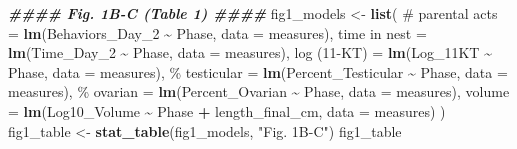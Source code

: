 \documentclass[
  landscape]{article}
\newenvironment{Shaded}{\begin{snugshade}}{\end{snugshade}}
\newcommand{\AttributeTok}[1]{\textcolor[rgb]{0.13,0.29,0.53}{#1}}
\newcommand{\DocumentationTok}[1]{\textcolor[rgb]{0.56,0.35,0.01}{\textbf{\textit{#1}}}}
\newcommand{\FunctionTok}[1]{\textcolor[rgb]{0.13,0.29,0.53}{\textbf{#1}}}
\newcommand{\NormalTok}[1]{#1}
\newcommand{\OtherTok}[1]{\textcolor[rgb]{0.56,0.35,0.01}{#1}}
\newcommand{\SpecialCharTok}[1]{\textcolor[rgb]{0.81,0.36,0.00}{\textbf{#1}}}
\newcommand{\StringTok}[1]{\textcolor[rgb]{0.31,0.60,0.02}{#1}}
\begin{document}
\begin{Shaded}
\begin{Highlighting}[]
\DocumentationTok{\#\#\#\# Fig. 1B{-}C (Table 1) \#\#\#\#}
\NormalTok{fig1\_models }\OtherTok{\textless{}{-}} \FunctionTok{list}\NormalTok{(}
  \StringTok{\textasciigrave{}}\AttributeTok{\# parental acts}\StringTok{\textasciigrave{}} \OtherTok{=} \FunctionTok{lm}\NormalTok{(Behaviors\_Day\_2 }\SpecialCharTok{\textasciitilde{}}\NormalTok{ Phase, }\AttributeTok{data =}\NormalTok{ measures),}
  \StringTok{\textasciigrave{}}\AttributeTok{time in nest}\StringTok{\textasciigrave{}}    \OtherTok{=} \FunctionTok{lm}\NormalTok{(Time\_Day\_2 }\SpecialCharTok{\textasciitilde{}}\NormalTok{ Phase, }\AttributeTok{data =}\NormalTok{ measures),}
  \StringTok{\textasciigrave{}}\AttributeTok{log (11{-}KT)}\StringTok{\textasciigrave{}}     \OtherTok{=} \FunctionTok{lm}\NormalTok{(Log\_11KT }\SpecialCharTok{\textasciitilde{}}\NormalTok{ Phase, }\AttributeTok{data =}\NormalTok{ measures),}
  \StringTok{\textasciigrave{}}\AttributeTok{\% testicular}\StringTok{\textasciigrave{}}    \OtherTok{=} \FunctionTok{lm}\NormalTok{(Percent\_Testicular }\SpecialCharTok{\textasciitilde{}}\NormalTok{ Phase, }\AttributeTok{data =}\NormalTok{ measures),}
  \StringTok{\textasciigrave{}}\AttributeTok{\% ovarian}\StringTok{\textasciigrave{}}       \OtherTok{=} \FunctionTok{lm}\NormalTok{(Percent\_Ovarian }\SpecialCharTok{\textasciitilde{}}\NormalTok{ Phase, }\AttributeTok{data =}\NormalTok{ measures),}
  \StringTok{\textasciigrave{}}\AttributeTok{volume}\StringTok{\textasciigrave{}}          \OtherTok{=} \FunctionTok{lm}\NormalTok{(Log10\_Volume }\SpecialCharTok{\textasciitilde{}}\NormalTok{ Phase }\SpecialCharTok{+}\NormalTok{ length\_final\_cm, }\AttributeTok{data =}\NormalTok{ measures)}
\NormalTok{)}
\NormalTok{fig1\_table }\OtherTok{\textless{}{-}} \FunctionTok{stat\_table}\NormalTok{(fig1\_models, }\StringTok{"Fig. 1B{-}C"}\NormalTok{)}
\NormalTok{fig1\_table}
\end{Highlighting}
\end{Shaded}
\end{document}
